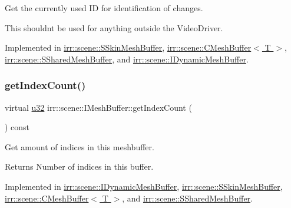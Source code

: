 Get the currently used ID for identification of changes. 

This shouldn\textquotesingle{}t be used for anything outside the Video\+Driver. 

Implemented in \hyperlink{structirr_1_1scene_1_1SSkinMeshBuffer_a94faa430425d73fbb6cab74ac65af1c1}{irr\+::scene\+::\+S\+Skin\+Mesh\+Buffer}, \hyperlink{classirr_1_1scene_1_1CMeshBuffer_a99abc7d5f5a9f34221c58a598b33ce3a}{irr\+::scene\+::\+C\+Mesh\+Buffer$<$ T $>$}, \hyperlink{structirr_1_1scene_1_1SSharedMeshBuffer_ad9c7307fcad8c9b8db3db98f95863196}{irr\+::scene\+::\+S\+Shared\+Mesh\+Buffer}, and \hyperlink{classirr_1_1scene_1_1IDynamicMeshBuffer_a3480aae22a6701453a19b4c4cbcf2555}{irr\+::scene\+::\+I\+Dynamic\+Mesh\+Buffer}.

\mbox{\label{classirr_1_1scene_1_1IMeshBuffer_a96e08662e15b1205516b87ada3301551}} 
\subsubsection{\texorpdfstring{get\+Index\+Count()}{getIndexCount()}}
{\footnotesize\ttfamily virtual \hyperlink{namespaceirr_a0416a53257075833e7002efd0a18e804}{u32} irr\+::scene\+::\+I\+Mesh\+Buffer\+::get\+Index\+Count (\begin{DoxyParamCaption}{ }\end{DoxyParamCaption}) const\hspace{0.3cm}{\ttfamily [pure virtual]}}



Get amount of indices in this meshbuffer. 

\begin{DoxyReturn}{Returns}
Number of indices in this buffer. 
\end{DoxyReturn}


Implemented in \hyperlink{classirr_1_1scene_1_1IDynamicMeshBuffer_adc483bdd7dfac4eb54e25c763ae1dae0}{irr\+::scene\+::\+I\+Dynamic\+Mesh\+Buffer}, \hyperlink{structirr_1_1scene_1_1SSkinMeshBuffer_adc00b4ce3b46d952575203c6e275e592}{irr\+::scene\+::\+S\+Skin\+Mesh\+Buffer}, \hyperlink{classirr_1_1scene_1_1CMeshBuffer_ac5585f4983423a4ba1f4ab4aba112c95}{irr\+::scene\+::\+C\+Mesh\+Buffer$<$ T $>$}, and \hyperlink{structirr_1_1scene_1_1SSharedMeshBuffer_a97a95470c8956fc0120466e57698081a}{irr\+::scene\+::\+S\+Shared\+Mesh\+Buffer}.

